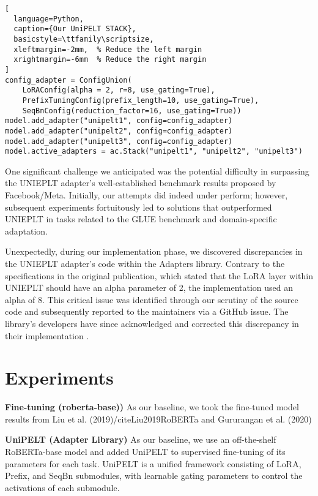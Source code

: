 \documentclass[10pt,twocolumn,letterpaper]{article}
\newcommand{\infobox}[1]{
  \begin{tcolorbox}[
    colback=gray!7!white,  %
    colframe=gray!75!black, %
    boxrule=0.75pt,  %
    sharp corners,  %
    top=2mm,  %
    bottom=2mm,  %
    left=2mm,  %
    right=2mm,  %
    boxsep=0.2mm,  %
    ]
    #1
  \end{tcolorbox}
}
\begin{document}
\begin{lstlisting}[
  language=Python,
  caption={Our UniPELT STACK},
  basicstyle=\ttfamily\scriptsize,  
  xleftmargin=-2mm,  % Reduce the left margin
  xrightmargin=-6mm  % Reduce the right margin
]
config_adapter = ConfigUnion(
    LoRAConfig(alpha = 2, r=8, use_gating=True),
    PrefixTuningConfig(prefix_length=10, use_gating=True),
    SeqBnConfig(reduction_factor=16, use_gating=True))
model.add_adapter("unipelt1", config=config_adapter)
model.add_adapter("unipelt2", config=config_adapter)
model.add_adapter("unipelt3", config=config_adapter)
model.active_adapters = ac.Stack("unipelt1", "unipelt2", "unipelt3")
\end{lstlisting}






One significant challenge we anticipated was the potential difficulty in surpassing the UNIEPLT adapter's well-established benchmark results proposed by Facebook/Meta. Initially, our attempts did indeed under perform; however, subsequent experiments fortuitously led to solutions that outperformed UNIEPLT in tasks related to the GLUE benchmark and domain-specific adaptation.

Unexpectedly, during our implementation phase, we discovered discrepancies in the UNIEPLT adapter's code within the Adapters library. Contrary to the specifications in the original publication, which stated that the LoRA layer within UNIEPLT should have an alpha parameter of 2, the implementation used an alpha of 8. This critical issue was identified through our scrutiny of the source code and subsequently reported to the maintainers via a GitHub issue. The library's developers have since acknowledged and corrected this discrepancy in their implementation \cite{UniPELTissue674}.






\section{Experiments}

\infobox{
    \textbf{Fine-tuning (roberta-base))} \quad As our baseline, we took the fine-tuned model results from Liu et al. (2019)/cite{Liu2019RoBERTa} and Gururangan et al. (2020)
}


\infobox{
    \textbf{UniPELT (Adapter Library)} \quad As our baseline, we use an off-the-shelf RoBERTa-base model and added UniPELT to supervised fine-tuning of its parameters for each task. UniPELT is a unified framework consisting of LoRA, Prefix, and SeqBn submodules, with learnable gating parameters to control the activations of each submodule.
}
\end{document}
